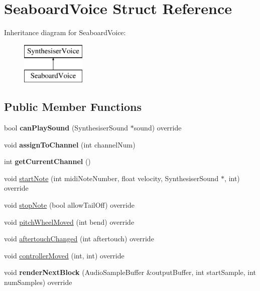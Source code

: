 \hypertarget{struct_seaboard_voice}{\section{Seaboard\-Voice Struct Reference}
\label{struct_seaboard_voice}
}
Inheritance diagram for Seaboard\-Voice\-:\begin{figure}[H]
\begin{center}
\leavevmode
\includegraphics[height=2.000000cm]{struct_seaboard_voice}
\end{center}
\end{figure}
\subsection*{Public Member Functions}
\begin{DoxyCompactItemize}
\item 
\hypertarget{struct_seaboard_voice_a183492fcd78d01ff3953f11afad77f38}{bool {\bfseries can\-Play\-Sound} (Synthesiser\-Sound $\ast$sound) override}\label{struct_seaboard_voice_a183492fcd78d01ff3953f11afad77f38}

\item 
\hypertarget{struct_seaboard_voice_a4a5e73cc70fcd4ffbb85b92832b09d52}{void {\bfseries assign\-To\-Channel} (int channel\-Num)}\label{struct_seaboard_voice_a4a5e73cc70fcd4ffbb85b92832b09d52}

\item 
\hypertarget{struct_seaboard_voice_a19ebdb5c571e624bdd42b3492976ef4b}{int {\bfseries get\-Current\-Channel} ()}\label{struct_seaboard_voice_a19ebdb5c571e624bdd42b3492976ef4b}

\item 
void \hyperlink{struct_seaboard_voice_a636f6b832a2caf65888a33012f4d0e80}{start\-Note} (int midi\-Note\-Number, float velocity, Synthesiser\-Sound $\ast$, int) override
\item 
void \hyperlink{struct_seaboard_voice_a5f939f503e0cd2804a05c6f5c24cf80f}{stop\-Note} (bool allow\-Tail\-Off) override
\item 
void \hyperlink{struct_seaboard_voice_ab2ad0ecedab846f4114bd36759587a31}{pitch\-Wheel\-Moved} (int bend) override
\item 
void \hyperlink{struct_seaboard_voice_a2155c54e1ec50cc644d0f9d7f35a2a45}{aftertouch\-Changed} (int aftertouch) override
\item 
void \hyperlink{struct_seaboard_voice_a315bbe67d968e1cbd053623a7b1cda7a}{controller\-Moved} (int, int) override
\item 
\hypertarget{struct_seaboard_voice_a2398839d0cffc137a2512669b9f0938f}{void {\bfseries render\-Next\-Block} (Audio\-Sample\-Buffer \&output\-Buffer, int start\-Sample, int num\-Samples) override}\label{struct_seaboard_voice_a2398839d0cffc137a2512669b9f0938f}

\end{DoxyCompactItemize}


